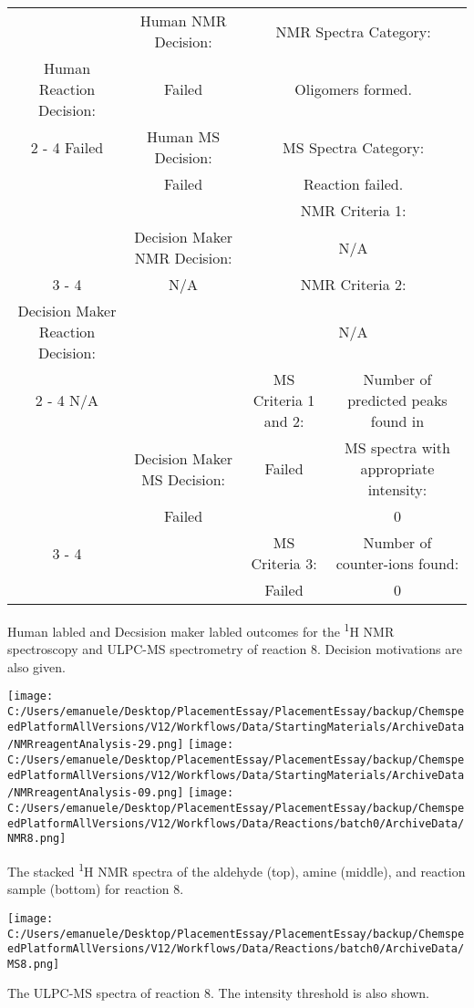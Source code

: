\documentclass{article}%
\begin{document}
\begin{Decision Table}[H]%
\begin{tabular}{|c|c|c|c|}%
\hline%
&Human NMR Decision:&\multicolumn{2}{|c|}{NMR Spectra Category:}\\%
Human Reaction Decision:&Failed&\multicolumn{2}{|c|}{Oligomers formed.}\\%
\cline{2%
-%
4}%
Failed&Human MS Decision:&\multicolumn{2}{|c|}{MS Spectra Category:}\\%
&Failed&\multicolumn{2}{|c|}{Reaction failed.}\\%
\hline%
&&\multicolumn{2}{|c|}{NMR Criteria 1:}\\%
&Decision Maker NMR Decision:&\multicolumn{2}{|c|}{N/A}\\%
\cline{3%
-%
4}%
&N/A&\multicolumn{2}{|c|}{NMR Criteria 2:}\\%
Decision Maker Reaction Decision:&&\multicolumn{2}{|c|}{N/A}\\%
\cline{2%
-%
4}%
N/A&&MS Criteria 1 and 2:&Number of predicted peaks found in\\%
&Decision Maker MS Decision:&Failed&MS spectra with appropriate intensity:\\%
&Failed&&0\\%
\cline{3%
-%
4}%
&&MS Criteria 3:&Number of counter{-}ions found:\\%
&&Failed&0\\%
\hline%
\end{tabular}%
\caption{Human labled and Decsision maker labled outcomes for the \textsuperscript{1}H NMR spectroscopy and ULPC-MS spectrometry of reaction 8. Decision motivations are also given.}%
\end{Decision Table}%
\begin{NMR Spectra}[H]%
\begin{center}%
\texttt{[image: C:/Users/emanuele/Desktop/PlacementEssay/PlacementEssay/backup/ChemspeedPlatformAllVersions/V12/Workflows/Data/StartingMaterials/ArchiveData/NMRreagentAnalysis-29.png]}\hfill%
\texttt{[image: C:/Users/emanuele/Desktop/PlacementEssay/PlacementEssay/backup/ChemspeedPlatformAllVersions/V12/Workflows/Data/StartingMaterials/ArchiveData/NMRreagentAnalysis-09.png]}\hfill%
\texttt{[image: C:/Users/emanuele/Desktop/PlacementEssay/PlacementEssay/backup/ChemspeedPlatformAllVersions/V12/Workflows/Data/Reactions/batch0/ArchiveData/NMR8.png]}\hfill%
\end{center}%
\caption{The stacked \textsuperscript{1}H NMR spectra of the aldehyde (top), amine (middle), and reaction sample (bottom) for reaction 8.}%
\end{NMR Spectra}%
\begin{MS Spectra}[H]%
\begin{center}%
\texttt{[image: C:/Users/emanuele/Desktop/PlacementEssay/PlacementEssay/backup/ChemspeedPlatformAllVersions/V12/Workflows/Data/Reactions/batch0/ArchiveData/MS8.png]}\hfill%
\end{center}%
\caption{The ULPC-MS spectra of reaction 8. The intensity threshold is also shown.}%
\end{MS Spectra}%
\end{document}
